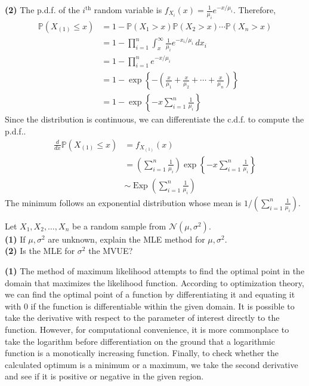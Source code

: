 \documentclass[answers]{exam}
\newcommand{\opn}{\operatorname}
\begin{document}
\begin{questions}
\begin{solution}
\end{solution}
\begin{solution}
   \textbf{(2)} The p.d.f. of the $i^{\text{th}}$ random variable is $f_{X_{i}}\left(x\right) = \frac{1}{\mu_{i}}e^{-x/\mu_{i}}$. Therefore,
   \begin{align*}
      \mathbb{P}\left(X_{\left(1\right)}\leq x\right) &= 1-\mathbb{P}\left(X_{1}>x\right)\mathbb{P}\left(X_{2}>x\right)\cdots \mathbb{P}\left(X_{n}>x\right)\\
      &= 1-\prod_{i=1}^{n}\int_{x}^{\infty}\frac{1}{\mu_{i}}e^{-x_{i}/\mu_{i}}\,dx_{i}\\
      &= 1-\prod_{i=1}^{n} e^{-x/\mu_{i}}\\
      &= 1-\exp\left\{-\left(\frac{x}{\mu_{1}}+\frac{x}{\mu_{2}} + \cdots + \frac{x}{\mu_{n}} \right)\right\}\\
      &= 1 - \exp\left\{-x\sum_{i=1}^{n}\frac{1}{\mu_{i}}\right\}
   \end{align*}
   Since the distribution is continuous, we can differentiate the c.d.f. to compute the p.d.f..
   \begin{align*}
      \frac{d}{dx}\mathbb{P}\left(X_{\left(1\right)}\leq x \right) &= f_{X_{\left(1\right)}}\left(x\right)\\
      &= \left(\sum_{i=1}^{n} \frac{1}{\mu_{i}}\right) \exp \left\{-x\sum_{i=1}^{n}\frac{1}{\mu_{i}} \right\}\\
      &\sim \opn{Exp}\left(\sum_{i=1}^{n}\frac{1}{\mu_{i}} \right)
   \end{align*}
   The minimum follows an exponential distribution whose mean is $1/\left(\sum_{i=1}^{n}\frac{1}{\mu_{i}} \right)$.
\end{solution}
   \question
   Let $X_{1}, X_{2}, \ldots , X_{n}$ be a random sample from $\mathcal{N}\left(\mu, \sigma^{2}\right)$.\\
   \textbf{(1)} If $\mu, \sigma^{2}$ are unknown, explain the MLE method for $\mu, \sigma^{2}$.\\
   \textbf{(2)} Is the MLE for $\sigma^{2}$ the MVUE?
   \begin{solution}
      \textbf{(1)} The method of maximum likelihood attempts to find the optimal point in the domain that maximizes the likelihood function. According to optimization theory, we can find the optimal point of a function by differentiating it and equating it with 0 if the function is differentiable within the given domain. It is possible to take the derivative with respect to the parameter of interest directly to the function. However, for computational convenience, it is more commonplace to take the logarithm before differentiation on the ground that a logarithmic function is a monotically increasing function. Finally, to check whether the calculated optimum is a minimum or a maximum, we take the second derivative and see if it is positive or negative in the given region.\par

\end{solution}
\end{questions}
\end{document}
